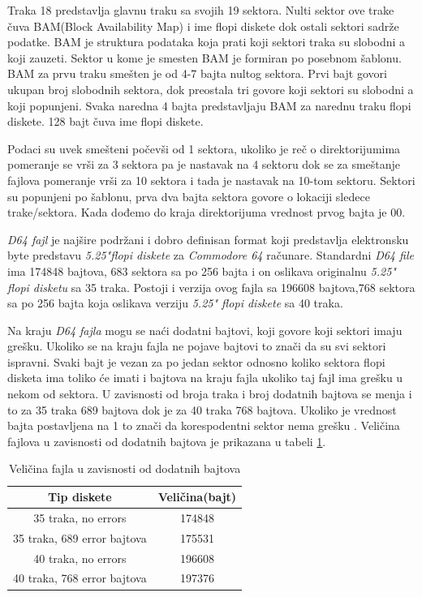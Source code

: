 Traka 18 predstavlja glavnu traku sa svojih 19 sektora. Nulti sektor ove trake čuva BAM(Block Availability Map) i ime flopi diskete dok ostali sektori sadrže podatke. BAM je struktura podataka koja prati koji sektori traka su slobodni a koji zauzeti. Sektor u kome je smesten BAM je formiran po posebnom šablonu. BAM za prvu traku smešten je od 4-7 bajta nultog sektora. Prvi bajt govori ukupan broj slobodnih sektora, dok preostala tri govore koji sektori su slobodni a koji popunjeni. Svaka naredna 4 bajta predstavljaju BAM za narednu traku flopi diskete. 128 bajt čuva ime flopi diskete.

Podaci su uvek smešteni počevši od 1 sektora, ukoliko je reč o direktorijumima pomeranje se vrši za 3 sektora pa je nastavak na 4 sektoru dok se za smeštanje fajlova pomeranje vrši za 10 sektora i tada je nastavak na 10-tom sektoru. Sektori su popunjeni po šablonu, prva dva bajta sektora govore o lokaciji sledece trake/sektora. Kada dođemo do kraja direktorijuma vrednost prvog bajta je 00.

\textit{D64 fajl} je najšire podržani i dobro definisan format koji predstavlja elektronsku byte predstavu \textit{5.25"flopi diskete} za \textit{Commodore 64} računare. Standardni \textit{D64 file} ima 174848 bajtova, 683 sektora sa po 256 bajta i on oslikava originalnu \textit{5.25" flopi disketu} sa 35 traka.  Postoji i verzija ovog fajla sa 196608 bajtova,768 sektora sa po 256 bajta koja oslikava verziju \textit{5.25" flopi diskete} sa 40 traka.

Na kraju \textit{D64 fajla} mogu se naći dodatni bajtovi, koji govore koji sektori imaju grešku. Ukoliko se na kraju fajla ne pojave bajtovi to znači da su svi sektori ispravni. Svaki bajt je vezan za po jedan sektor odnosno koliko sektora flopi disketa ima toliko će imati i bajtova na kraju fajla ukoliko taj fajl ima grešku u nekom od sektora. U zavisnosti od broja traka i broj dodatnih bajtova se menja i to za 35 traka 689 bajtova dok je za 40 traka 768 bajtova. Ukoliko je vrednost bajta postavljena na 1 to znači da korespodentni sektor nema grešku \cite{D64}. Veličina fajlova u zavisnosti od dodatnih bajtova je prikazana u tabeli \ref{tab:error_velicina}.
\begin{table}[h!]
\begin{center}
\begin{tabular}{ | c | c |} 
\hline
Tip diskete & Veličina(bajt) \\
\hline
\hline
35 traka, no errors & 174848 \\
\hline
35 traka, 689 error bajtova & 175531 \\
\hline
40 traka, no errors & 196608 \\
\hline
40 traka, 768 error bajtova & 197376 \\
\hline
\end{tabular}
\end{center}
\caption{Veličina fajla u zavisnosti od dodatnih bajtova}
\label{tab:error_velicina}
\end{table}
